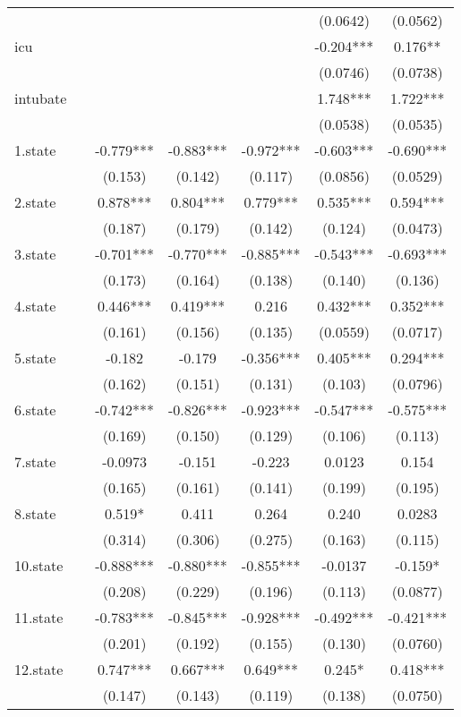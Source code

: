 \documentclass[]{article}
\begin{document}
\begin{tabular}{lcccccc}
 &  &  &  &  & (0.0642) & (0.0562) \\
icu &  &  &  &  & -0.204*** & 0.176** \\
 &  &  &  &  & (0.0746) & (0.0738) \\
intubate &  &  &  &  & 1.748*** & 1.722*** \\
 &  &  &  &  & (0.0538) & (0.0535) \\
1.state &  & -0.779*** & -0.883*** & -0.972*** & -0.603*** & -0.690*** \\
 &  & (0.153) & (0.142) & (0.117) & (0.0856) & (0.0529) \\
2.state &  & 0.878*** & 0.804*** & 0.779*** & 0.535*** & 0.594*** \\
 &  & (0.187) & (0.179) & (0.142) & (0.124) & (0.0473) \\
3.state &  & -0.701*** & -0.770*** & -0.885*** & -0.543*** & -0.693*** \\
 &  & (0.173) & (0.164) & (0.138) & (0.140) & (0.136) \\
4.state &  & 0.446*** & 0.419*** & 0.216 & 0.432*** & 0.352*** \\
 &  & (0.161) & (0.156) & (0.135) & (0.0559) & (0.0717) \\
5.state &  & -0.182 & -0.179 & -0.356*** & 0.405*** & 0.294*** \\
 &  & (0.162) & (0.151) & (0.131) & (0.103) & (0.0796) \\
6.state &  & -0.742*** & -0.826*** & -0.923*** & -0.547*** & -0.575*** \\
 &  & (0.169) & (0.150) & (0.129) & (0.106) & (0.113) \\
7.state &  & -0.0973 & -0.151 & -0.223 & 0.0123 & 0.154 \\
 &  & (0.165) & (0.161) & (0.141) & (0.199) & (0.195) \\
8.state &  & 0.519* & 0.411 & 0.264 & 0.240 & 0.0283 \\
 &  & (0.314) & (0.306) & (0.275) & (0.163) & (0.115) \\
10.state &  & -0.888*** & -0.880*** & -0.855*** & -0.0137 & -0.159* \\
 &  & (0.208) & (0.229) & (0.196) & (0.113) & (0.0877) \\
11.state &  & -0.783*** & -0.845*** & -0.928*** & -0.492*** & -0.421*** \\
 &  & (0.201) & (0.192) & (0.155) & (0.130) & (0.0760) \\
12.state &  & 0.747*** & 0.667*** & 0.649*** & 0.245* & 0.418*** \\
 &  & (0.147) & (0.143) & (0.119) & (0.138) & (0.0750) \\

\end{tabular}
\end{document}
